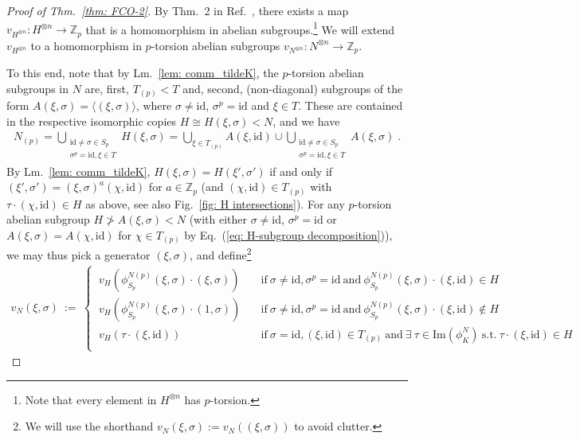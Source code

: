\documentclass[aps,pra,letterpaper,onrcolumn,nofootinbib,notitlepage,longbibliography]{revtex4-1}
\newcommand{\id}{\mathrm{id}}
\newcommand{\ra}{\ensuremath{\rightarrow}}
\newcommand{\zz}{\mathbb Z}
\begin{document}
\begin{proof}[Proof of Thm.~\ref{thm: FCO-2}]
    By Thm.~2 in Ref.~\cite{QassimWallman2020}, there exists a map $v_{H^{\otimes n}}:H^{\otimes n}\ra\zz_p$ that is a homomorphism in abelian subgroups.\footnote{Note that every element in $H^{\otimes n}$ has $p$-torsion.} We will extend $v_{H^{\otimes n}}$ to a homomorphism in $p$-torsion abelian subgroups $v_{N^{\otimes n}}:N^{\otimes n}\ra\zz_p$. 
    
    To this end, note that by Lm.~\ref{lem: comm_tildeK}, the $p$-torsion abelian subgroups in $N$ are, first, $T_{(p)}<T$ and, second, (non-diagonal) subgroups of the form $A(\xi,\sigma)=\langle(\xi,\sigma)\rangle$, where $\sigma\neq\id$, $\sigma^p=\id$ and $\xi\in T$. These are contained in the respective isomorphic copies $H\cong H(\xi,\sigma)<N$, and we have
    \begin{align}\label{eq: H-subgroup decomposition}
        N_{(p)}
        =\bigcup_{\substack{\id\neq\sigma\in S_p\\ \sigma^p=\id,\xi\in T}} H(\xi,\sigma)
        =\bigcup_{\xi\in T_{(p)}}A(\xi,\id)\cup\bigcup_{\substack{\id\neq\sigma\in S_p\\ \sigma^p=\id,
        \xi\in T}} A(\xi,\sigma)\; .
    \end{align}
    By Lm.~\ref{lem: comm_tildeK}, $H(\xi,\sigma)=H(\xi',\sigma')$ if and only if $(\xi',\sigma')=(\xi,\sigma)^a(\chi,\id)$ for $a\in\zz_p$ (and $(\chi,\id)\in T_{(p)}$ with $\tau\cdot(\chi,\id)\in H$ as above, see also Fig.~\ref{fig: H intersections}). For any $p$-torsion abelian subgroup $H\not>A(\xi,\sigma)<N$ (with either $\sigma\neq\id$, $\sigma^p=\id$ or $A(\xi,\sigma)=A(\chi,\id)$ for $\chi\in T_{(p)}$ by Eq.~(\ref{eq: H-subgroup decomposition})), we may thus pick a generator $(\xi,\sigma)$, and define\footnote{We will use the shorthand $v_N(\xi,\sigma):=v_N((\xi,\sigma))$ to avoid clutter.}
    \begin{align}\label{eq: def v_N}
        v_N(\xi,\sigma)\
        :=\ \begin{cases}
            \ v_H(\phi^{N(p)}_{S_p}(\xi,\sigma)\cdot(\xi,\sigma))  & \quad\mathrm{if}\ \sigma\neq\id,\sigma^p=\id\ \mathrm{and}\ \phi^{N(p)}_{S_p}(\xi,\sigma)\cdot(\xi,\id)\in H \\
            \ v_H(\phi^{N(p)}_{S_p}(\xi,\sigma)\cdot(1,\sigma)) & \quad\mathrm{if}\ \sigma\neq\id,\sigma^p=\id\ \mathrm{and}\ \phi^{N(p)}_{S_p}(\xi,\sigma)\cdot(\xi,\id)\notin H \\
            \ v_H(\tau\cdot(\xi,\id)) & \quad\mathrm{if}\ \sigma=\id,(\xi,\id)\in T_{(p)}\ \mathrm{and}\ \exists\ \tau\in\mathrm{Im}(\phi^N_K)\ \mathrm{s.t.}\ \tau\cdot(\xi,\id)\in H \\

\end{cases}
\end{align}
\end{proof}
\end{document}
